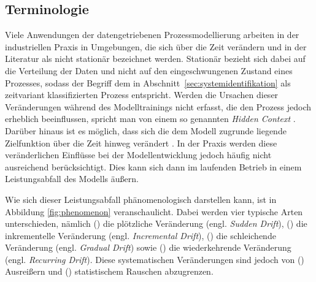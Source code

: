 \subsection{Terminologie} \label{sec:terminologie}
%
Viele Anwendungen der datengetriebenen Prozessmodellierung arbeiten in der industriellen Praxis in Umgebungen, die sich über die Zeit verändern und in der Literatur als nicht stationär bezeichnet werden. Stationär bezieht sich dabei auf die Verteilung der Daten und nicht auf den eingeschwungenen Zustand eines Prozesses, sodass der Begriff dem in Abschnitt~\ref{sec:systemidentifikation} als zeitvariant klassifizierten Prozess entspricht. Werden die Ursachen dieser Veränderungen während des Modelltrainings nicht erfasst, die den Prozess jedoch erheblich beeinflussen, spricht man von einem so genannten \emph{Hidden Context} \cite{widmer.1996}. Darüber hinaus ist es möglich, dass sich die dem Modell zugrunde liegende Zielfunktion über die Zeit hinweg verändert \cite{hoens.2012}. In der Praxis werden diese veränderlichen Einflüsse bei der Modellentwicklung jedoch häufig nicht ausreichend berücksichtigt. Dies kann sich dann im laufenden Betrieb in einem Leistungsabfall des Modells äußern. \par
Wie sich dieser Leistungsabfall phänomenologisch darstellen kann, ist in Abbildung \ref{fig:phenomenon} veranschaulicht. Dabei werden vier typische Arten unterschieden, nämlich () die plötzliche Veränderung (engl. \emph{Sudden Drift}), () die inkrementelle Veränderung (engl. \emph{Incremental Drift}), () die schleichende Veränderung (engl. \emph{Gradual Drift}) sowie () die wiederkehrende Veränderung (engl. \emph{Recurring Drift}). Diese systematischen Veränderungen sind jedoch von () Ausreißern und () statistischem Rauschen abzugrenzen. \par
%
